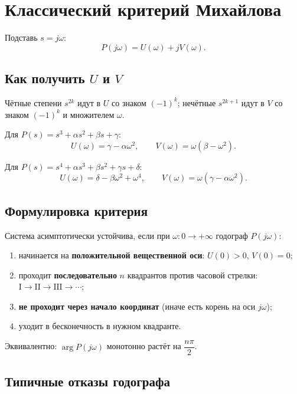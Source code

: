 \documentclass[11pt,a4paper]{article}
\newcommand{\jomega}{j\omega}
\begin{document}
\section{Классический критерий Михайлова}

Подставь \(s=\jomega\):
\[
P(\jomega)=U(\omega)+jV(\omega).
\]

\subsection{Как получить \texorpdfstring{\(U\) и \(V\)}{U и V}}

Чётные степени \(s^{2k}\) идут в \(U\) со знаком \((-1)^k\);
нечётные \(s^{2k+1}\) идут в \(V\) со знаком \((-1)^k\) и множителем \(\omega\).

Для \(P(s)=s^3+\alpha s^2+\beta s+\gamma\):
\[
U(\omega)=\gamma-\alpha\omega^2,\qquad
V(\omega)=\omega(\beta-\omega^2).
\]

Для \(P(s)=s^4+\alpha s^3+\beta s^2+\gamma s+\delta\):
\[
U(\omega)=\delta-\beta\omega^2+\omega^4,\qquad
V(\omega)=\omega(\gamma-\alpha\omega^2).
\]

\subsection{Формулировка критерия}

Система асимптотически устойчива, если при \(\omega:0\to+\infty\) годограф \(P(\jomega)\):
\begin{enumerate}
  \item начинается на \textbf{положительной вещественной оси}: \(U(0)>0\), \(V(0)=0\);
  \item проходит \textbf{последовательно} \(n\) квадрантов против часовой стрелки:
        \(\mathrm{I}\to\mathrm{II}\to\mathrm{III}\to\cdots\);
  \item \textbf{не проходит через начало координат} (иначе есть корень на оси \(j\omega\));
  \item уходит в бесконечность в нужном квадранте.
\end{enumerate}

Эквивалентно: \(\arg P(\jomega)\) монотонно растёт на \(\dfrac{n\pi}{2}\).

\subsection{Типичные отказы годографа}
\end{document}
